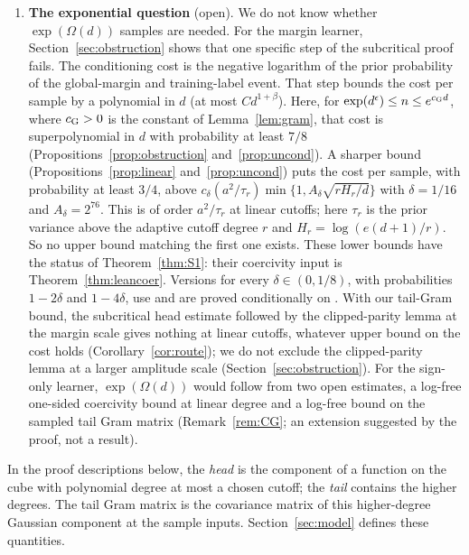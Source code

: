\documentclass[11pt]{article}
\theoremstyle{definition}\newtheorem{assumption}[theorem]{Assumption}
\theoremstyle{remark}\newtheorem{remark}[theorem]{Remark}
\begin{document}
\begin{enumerate}
accompanying Lean project \cite{leanproject}, closed with the standard
axioms; the rest of
the proof is conventional and not formalized. For
$n\le n_0(d)=d^{\Theta(\sqrt d)}$ the conclusion already follows from
item~2. All constants are explicit, but with them $d_0$ is astronomically
large (Remark~\ref{rem:d0}). The same proof covers $\operatorname{erf}$
(Remark~\ref{rem:S1act}), and by Remark~\ref{rem:readout} the conclusion
also holds for the margin learner with readout variance $\sigma_L^2N^{-b}$,
$b<1$.
\item \textbf{The exponential question} (open). We do not know whether
$\exp(\Omega(d))$ samples are needed. For the margin learner,
Section~\ref{sec:obstruction} shows that one specific step of the
subcritical proof fails. The conditioning cost is the negative logarithm
of the prior probability of the global-margin and training-label event.
That step bounds the cost per sample by a polynomial in $d$ (at most
$Cd^{1+\beta}$). Here, for
$\exp(d^\epsilon)\le n\le e^{c_{\rm G}d}$, where $c_{\rm G}>0$ is the
constant of Lemma~\ref{lem:gram}, that cost is superpolynomial in $d$ with
probability at least $7/8$ (Propositions~\ref{prop:obstruction}
and~\ref{prop:uncond}). A sharper bound (Propositions~\ref{prop:linear}
and~\ref{prop:uncond}) puts the cost per sample, with probability at least
$3/4$, above $c_\delta(a^2/\tau_r)\min\{1,A_\delta\sqrt{rH_r/d}\}$ with
$\delta=1/16$ and $A_\delta=2^{76}$. This is of order $a^2/\tau_r$ at
linear cutoffs; here $\tau_r$ is the prior variance above the adaptive
cutoff degree $r$ and $H_r=\log(e(d+1)/r)$. So no upper bound matching the
first one exists. These lower bounds have the status of
Theorem~\ref{thm:S1}: their coercivity input is
Theorem~\ref{thm:leancoer}. Versions for every $\delta\in(0,1/8)$, with
probabilities $1-2\delta$ and $1-4\delta$, use
\cite[Lemma~4.4]{subcritical} and are proved conditionally on
\cite[Lemma~4.1]{subcritical}. With our tail-Gram bound, the subcritical
head estimate followed by the clipped-parity lemma at the margin scale
gives nothing at linear cutoffs, whatever upper bound on the cost holds
(Corollary~\ref{cor:route}); we do not exclude the clipped-parity lemma at
a larger amplitude scale (Section~\ref{sec:obstruction}). For the
sign-only learner,
$\exp(\Omega(d))$ would follow from two open estimates, a log-free
one-sided coercivity bound at linear degree and a log-free bound on the
sampled tail Gram matrix (Remark~\ref{rem:CG}; an extension suggested by
the proof, not a result).
\end{enumerate}
In the proof descriptions below, the \emph{head} is the component of a
function on the cube with polynomial degree at most a chosen cutoff;
the \emph{tail} contains the higher degrees. The tail Gram matrix is
the covariance matrix of this higher-degree Gaussian component at the
sample inputs. Section~\ref{sec:model} defines these quantities.
\end{document}
